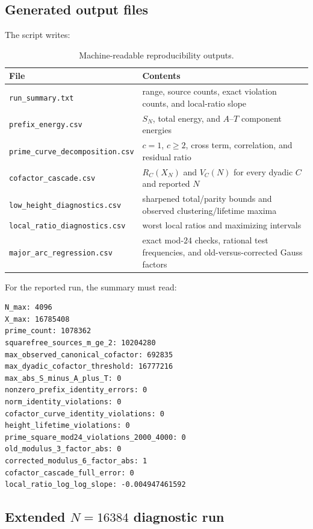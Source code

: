 \subsection{Generated output files}

The script writes:

\begin{table}[htbp]
\centering
\caption{Machine-readable reproducibility outputs.}
\label{tab:repro-files}
\small
\begin{tabular}{lp{}}
\toprule
File & Contents\\
\midrule
\texttt{run\_summary.txt}
& range, source counts, exact violation counts, and local-ratio slope\\
\texttt{prefix\_energy.csv}
& $S_N$, total energy, and $A$--$T$ component energies\\
\texttt{prime\_curve\_decomposition.csv}
& $c=1$, $c\ge2$, cross term, correlation, and residual ratio\\
\texttt{cofactor\_cascade.csv}
& $R_C(X_N)$ and $V_C(N)$ for every dyadic $C$ and reported $N$\\
\texttt{low\_height\_diagnostics.csv}
& sharpened total/parity bounds and observed clustering/lifetime maxima\\
\texttt{local\_ratio\_diagnostics.csv}
& worst local ratios and maximizing intervals\\
\texttt{major\_arc\_regression.csv}
& exact mod-$24$ checks, rational test frequencies, and old-versus-corrected Gauss factors\\
\bottomrule
\end{tabular}
\end{table}

For the reported run, the summary must read:
\begin{verbatim}
N_max: 4096
X_max: 16785408
prime_count: 1078362
squarefree_sources_m_ge_2: 10204280
max_observed_canonical_cofactor: 692835
max_dyadic_cofactor_threshold: 16777216
max_abs_S_minus_A_plus_T: 0
nonzero_prefix_identity_errors: 0
norm_identity_violations: 0
cofactor_curve_identity_violations: 0
height_lifetime_violations: 0
prime_square_mod24_violations_2000_4000: 0
old_modulus_3_factor_abs: 0
corrected_modulus_6_factor_abs: 1
cofactor_cascade_full_error: 0
local_ratio_log_log_slope: -0.004947461592
\end{verbatim}

\subsection{\texorpdfstring{Extended $N=16384$ diagnostic run}{Extended N=16384 diagnostic run}}

